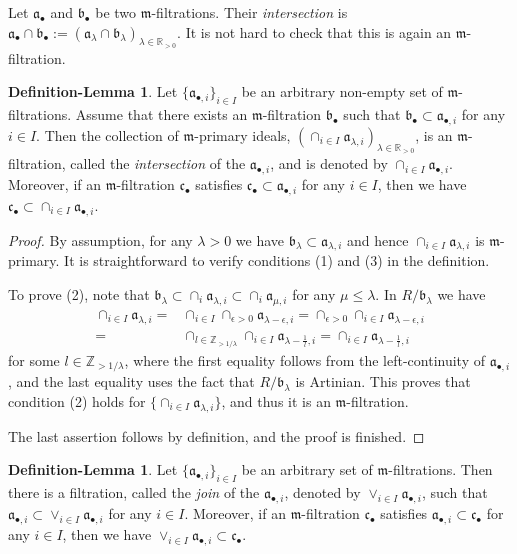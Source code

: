 \documentclass[11pt, leqno]{amsart}%
\theoremstyle{plain}
\theoremstyle{definition}
\newtheorem{deflem}[theorem]{Definition-Lemma}
\theoremstyle{remark}
\newcommand{\bR}{\mathbb{R}}
\newcommand{\bZ}{\mathbb{Z}}
\newcommand{\fa}{\mathfrak{a}}
\newcommand{\fb}{\mathfrak{b}}
\newcommand{\fc}{\mathfrak{c}}
\newcommand{\fm}{\mathfrak{m}}
\numberwithin{equation}{section}
\begin{document}
Let $\fa_\bullet$ and $\fb_\bullet$ be two $\fm$-filtrations. Their \emph{intersection} is $\fa_\bullet\cap \fb_\bullet:=(\fa_\lambda\cap \fb_\lambda)_{\lambda\in\bR_{>0}}$. %
It is not hard to check that this is again an $\fm$-filtration. 

\begin{deflem}\label{deflem:arbitrary intersection}
    Let $\{\fa_{\bullet,i}\}_{i\in I}$ be an arbitrary non-empty set of $\fm$-filtrations. Assume that there exists an $\fm$-filtration $\fb_\bullet$ such that $\fb_\bullet\subset\fa_{\bullet,i}$ for any $i\in I$. Then the collection of $\fm$-primary ideals, $(\cap_{i\in I} \fa_{\lambda,i})_{\lambda\in\bR_{>0}}$, is an $\fm$-filtration, called the \emph{intersection} of the $\fa_{\bullet,i}$, and is denoted by $\cap_{i\in I}\fa_{\bullet,i}$. Moreover, if an $\fm$-filtration $\fc_\bullet$ satisfies $\fc_\bullet\subset\fa_{\bullet,i}$ for any $i\in I$, then we have $\fc_\bullet\subset\cap_{i\in I}\fa_{\bullet,i}$.
\end{deflem}

\begin{proof}
    By assumption, for any $\lambda>0$ we have $\fb_\lambda\subset\fa_{\lambda,i}$ and hence $\cap_{i\in I} \fa_{\lambda,i}$ is $\fm$-primary. It is straightforward to verify conditions (1) and (3) in the definition.
	
    To prove (2), note that $\fb_\lambda\subset\cap_i\fa_{\lambda,i}\subset\cap_i\fa_{\mu,i}$ for any $\mu\le \lambda$. In $R/\fb_\lambda$ we have
    \begin{align*}
        \cap_{i\in I}\fa_{\lambda,i}=&\cap_{i\in I}\cap_{\epsilon>0}\fa_{\lambda-\epsilon,i}=\cap_{\epsilon>0}\cap_{i\in I} \fa_{\lambda-\epsilon,i}\\
        =&\cap_{l\in\bZ_{>1/\lambda}} \cap_{i\in I} \fa_{\lambda-\frac{1}{l},i}=\cap_{i\in I} \fa_{\lambda-\frac{1}{l},i}
    \end{align*}
    for some $l\in\bZ_{>1/\lambda}$, where the first equality follows from the left-continuity of $\fa_{\bullet,i}$, and the last equality uses the fact that $R/\fb_\lambda$ is Artinian. This proves that condition (2) holds for $\{\cap_{i\in I}\fa_{\lambda,i}\}$, and thus it is an $\fm$-filtration.
	
    The last assertion follows by definition, and the proof is finished.
\end{proof}

\begin{deflem}\label{deflem:join of filtrations}
    Let $\{\fa_{\bullet,i}\}_{i\in I}$ be an arbitrary set of $\fm$-filtrations. Then there is a filtration, called the \emph{join} of the $\fa_{\bullet,i}$, denoted by $\vee_{i\in I}\fa_{\bullet,i}$, such that  $\fa_{\bullet,i}\subset\vee_{i\in I}\fa_{\bullet,i}$ for any $i\in I$. Moreover, if an $\fm$-filtration $\fc_\bullet$ satisfies $\fa_{\bullet,i}\subset\fc_\bullet$ for any $i\in I$, then we have $\vee_{i\in I}\fa_{\bullet,i}\subset\fc_\bullet$.
\end{deflem}
\end{document}

